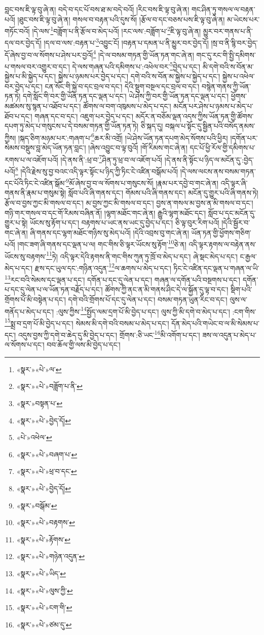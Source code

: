 བླང་བས་ཇི་ལྟ་བུ་ཞེ་ན། བདེ་བ་དང་པོ་བས་ཐ་མ་བདེ་བའོ། །རིང་བས་ཇི་ལྟ་བུ་ཞེ་ན། གང་ཤིན་ཏུ་གསལ་ལ་བརྟན་པའོ། །ཐུང་བས་ཇི་ལྟ་བུ་ཞེ་ན། གསལ་བ་བརྟན་པའི་དུས་སོ། །རྩོལ་བ་དང་བཅས་པས་ཇི་ལྟ་བུ་ཞེ་ན། མ་ཡེངས་པར་གཏོང་བའོ། །དེ་ལས་\footnote{«སྣར་»«པེ་»ལ་}བཟློག་པ་ནི་རྩོལ་བ་མེད་པའོ། །རང་ལས་:བཟློག་པ་\footnote{«སྣར་»«པེ་»བཟློག་པ་ནི་}ཇི་ལྟ་བུ་ཞེ་ན། མྱུར་བར་གནས་པ་ནི་དལ་བར་བྱེད་དོ། །དལ་བ་ལས་:བརྟན་པ་\footnote{«སྣར་»བསྟན་པ་}འབྱུང་ངོ། །བརྟན་པ་དམན་པ་ནི་མྱུར་བར་བྱེད་དོ། །སྲ་བ་ནི་སྙི་བར་བྱེད་དོ་ཞེས་བྱ་བ་ལ་སོགས་པ་ཤེས་པར་བྱའོ།\footnote{«སྣར་»«པེ་»བྱེད་དོ།} །དེ་ལ་བསམ་གཏན་གྱི་ཡོན་ཏན་གང་ཞེ་ན། གང་དུ་རང་གི་སྤྱི་དམིགས་པ་གསལ་བར་འགྱུར་བ་དང་། དེ་ལས་གཞན་པའི་དམིགས་པ་:འཕེལ་བར་\footnote{«པེ་»འཕེལ་}བྱེད་པ་དང་། མི་དགེ་བའི་ས་བོན་མ་སྐྱེས་པ་མི་སྐྱེད་པ་དང་། སྐྱེས་པ་ཉམས་པར་བྱེད་པ་དང་། དགེ་བའི་ས་བོན་མ་སྐྱེས་པ་སྐྱེད་པ་དང་། སྐྱེས་པ་འཕེལ་བར་བྱེད་པ་དང་། ངན་སོང་གི་སྐྱེ་བ་དང་བྲལ་བ་དང་། དེའི་སྡུག་བསྔལ་དང་བྲལ་བ་དང་། བསྙེན་གནས་ཀྱི་ཡོན་ཏན་ཏེ། དགེ་སློང་གི་བར་གྱི་ཡོན་ཏན་དང་ལྡན་པ་དང་། ཡེ་ཤེས་ཀྱི་བར་གྱི་ཡོན་ཏན་དང་ལྡན་པ་དང་། ཕྱོགས་མཚམས་སུ་སྙན་པ་འཐོབ་པ་དང་། ཚོགས་ལ་བག་འཁུམས་པ་མེད་པ་དང་། མངོན་པར་ཤེས་པ་ཉམས་པ་མེད་པ་ཐོབ་པ་དང་། གཞན་དང་བ་དང་། འཇུག་པར་བྱེད་པ་དང་། མདོར་ན་བཅོམ་ལྡན་འདས་ཀྱིས་ཡོན་ཏན་གྱི་ཚོགས་དཔག་ཏུ་མེད་པ་གསུངས་པ་དེ་བསམ་གཏན་གྱི་ཡོན་ཏན་ཏེ། ཅི་སྐད་དུ། བསྐལ་པ་སྟོང་དུ་སྦྱིན་པའི་བསོད་ནམས་ཀྱིས། །སྐད་ཅིག་མཉམ་པར་:གཞག་པ་\footnote{«སྣར་»«པེ་»བཞག་པ་}ཆར་མི་འགྲོ། །ཡེ་ཤེས་ཡོན་ཏན་དཔག་མེད་སོགས་པའི་ཕྱིར། །དགོན་པར་སེམས་བསྡུས་བླ་མེད་ཡོན་ཏན་བླང་། །ཞེས་འབྱུང་བ་ལྟ་བུའོ། །གོ་རིམས་གང་ཞེ་ན། དང་པོ་ཕྱི་རོལ་གྱི་དམིགས་པ་རགས་པ་ལ་འཇོག་པའོ། །དེ་ནས་ནི་:ཕྲ་བ་\footnote{«སྣར་»«པེ་»ཕྲ་བ་དང་}ཤིན་ཏུ་ཕྲ་བ་ལ་འཇོག་པའོ། །དེ་ནས་ནི་སྟོང་པ་ཉིད་ལ་མངོན་དུ་:བྱེད་པའོ།\footnote{«སྣར་»«པེ་»བྱེད་དོ།} །དེའི་རྗེས་སུ་བྱ་བའང་འདི་ལྟར་སྟོང་པ་ཉིད་ཀྱི་ཏིང་ངེ་འཛིན་བསྒོམ་པའོ། །དེ་ལས་ལངས་ནས་བསམ་གཏན་དང་པོའི་ཏིང་ངེ་འཛིན་སྒོམ་\footnote{«སྣར་»བསྒོམ་}མོ་ཞེས་བྱ་བ་ལ་སོགས་པ་གསུངས་སོ། །རྣམ་པར་དབྱེ་བ་གང་ཞེ་ན། འདི་ལྟར་ཞི་གནས་ནི་རྣམ་པ་གསུམ་སྟེ། སློབ་པའི་ཞི་གནས་དང་། གོམས་པའི་ཞི་གནས་དང་། མངོན་དུ་གྱུར་པའི་ཞི་གནས་ཏེ། རྩོལ་བ་བྱས་ཀྱང་མི་གསལ་བ་དང་། མ་བྱས་ཀྱང་མི་གསལ་བ་དང་། བྱས་ན་གསལ་མ་བྱས་ན་མི་གསལ་བ་དང་། གཉི་གར་གསལ་བ་དང་གོ་རིམས་བཞིན་ནོ། །ལྷག་མཐོང་གང་ཞེ་ན། རྒྱུའི་ལྷག་མཐོང་དང་། སློབ་པ་དང་མངོན་དུ་གྱུར་པ་སྟེ། ཡོངས་སུ་རྟོག་པ་དང་། བརྟགས་པ་ཡང་ནས་ཡང་དུ་བྱེད་པ་དང་། ཅི་ལྟ་བུར་རིག་པའོ། །དེའི་སྦྱོར་བ་གང་ཞེ་ན། ཞི་གནས་དང་ལྷག་མཐོང་གཉིས་སུ་མེད་པའོ། །དེའི་འབྲས་བུ་གང་ཞེ་ན། ཡོན་ཏན་གྱི་ཕྱོགས་གཅིག་པའོ། །གང་ཟག་ཞི་གནས་དང་ལྡན་པ་ལ། གང་གིས་ཅི་ལྟར་ཡོངས་སུ་རྟོག་\footnote{«སྣར་»«པེ་»བརྟགས་}ཅེ་ན། འདི་ལྟར་རྟགས་ལ་བརྟེན་ནས་ཡོངས་སུ་བརྟགས་\footnote{«སྣར་»«པེ་»རྟོགས་}ཏེ། འདི་ལྟར་དེའི་རྟགས་ནི་གང་གིས་ཀུན་ཏུ་ཁྲོ་བ་མེད་པ་དང་། ཞེ་སྡང་མེད་པ་དང་། ང་རྒྱལ་མེད་པ་དང་། རྫས་དང་ཡུལ་དང་:གཉིན་འདུན་\footnote{«སྣར་»«པེ་»གཉེན་འདུན་}ལ་ཆགས་པ་མེད་པ་དང་། ཏིང་ངེ་འཛིན་དང་ལྡན་པ་གཞན་ལ་ཡི་\footnote{«སྣར་»«པེ་»ཡིད་}རང་བའི་སེམས་དང་ལྡན་པ་དང་། དགོན་པ་དང་དུ་ལེན་པ་དང་། གཞན་ལ་དགོན་པའི་བསྔགས་པ་དང་། དགོན་པ་དང་དུ་ལེན་པ་ལ་ཡོན་ཏན་བརྗོད་པ་དང་། ཚོགས་ཀྱི་ནང་ན་མི་གནས་ཤིང་དེ་ལ་སྐྱོན་དུ་ལྟ་བ་དང་། སྡིག་པའི་གྲོགས་པོ་མི་བསྟེན་པ་དང་། དགེ་བའི་གྲོགས་པོ་དང་དུ་ལེན་པ་དང་། བསམ་གཏན་ཡུན་རིང་བ་དང་། ལུས་ལ་གནོད་པ་མེད་པ་དང་། :ལུས་ཀྱིས་\footnote{«སྣར་»«པེ་»ལུས་ཀྱི་}སྤྱོད་ལམ་དྲག་པོ་མི་བྱེད་པ་དང་། ལུས་ཀྱི་མི་དགེ་བ་མེད་པ་དང་། :ངག་གིས་\footnote{«སྣར་»«པེ་»ངག་གི་}སྨྲ་བ་དྲག་པོ་མི་བྱེད་པ་དང་། སེམས་མི་དགེ་བའི་བསམ་པ་མེད་པ་དང་། དོན་མེད་པའི་གཡེང་བ་ལ་མི་སེམས་པ་དང་། འདུས་བྱས་ཀྱི་དགེ་བ་ཆེད་དུ་མི་བྱེད་པ་དང་། གྲོགས་:ཅི་ཡང་\footnote{«སྣར་»«པེ་»ཙམ་དུ་}མི་འགོག་པ་དང་། ཟས་ལ་འདུན་པ་མེད་པ་ལ་སོགས་པ་དང་། བབ་ཆོལ་གྱི་ལས་མི་བྱེད་པ་དང་། 